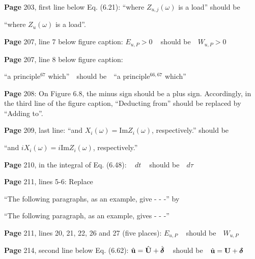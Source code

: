 \documentclass[a4paper,12pt]{article}
\newcommand{\bdelta}{\mbox{\boldmath ${\rm \delta}$}}
\begin{document}
\noindent %
{\bf Page} 203, first line below Eq. (6.21):    
``where $Z_{u,j}(\omega)$ is a load'' should be 

``where $Z_{u}(\omega)$ is a load''.   %
\vspace{0.2cm}

\noindent %
{\bf Page} 207, line 7 below figure caption:  $E_{u,P} > 0$ \,\,\ should be \,\, $W_{u,P} > 0$ 
\vspace{0.2cm}

\noindent%
{\bf Page} 207, line 8 below figure caption:  

``a principle$^{67}$ which'' \,\ should be \,\,  ``a principle$^{66,67}$ which'' %
\vspace{0.2cm} 

\noindent %
{\bf Page} 208: On Figure 6.8, the minus sign should be a plus sign. Accordingly, in the third line of the figure caption,    
``Deducting from'' should be replaced by ``Adding to''.   %
\vspace{0.2cm}

\noindent %
{\bf Page} 209, last line:    
``and $X_i(\omega)=\mbox{Im}{Z_i(\omega)}$, respectively.'' should be 

``and $iX_i(\omega)=i\mbox{Im}{Z_i(\omega)}$, respectively.''   %
\vspace{0.2cm}

\noindent %
{\bf Page} 210, in the integral of Eq. (6.48): \,\,\,  $dt$ \,\,\ should be \,\,
 $d\tau$ %

\vspace{0.2cm}

\noindent %
{\bf Page} 211, lines 5-6: Replace 

``The following paragraphs, as an example, give - - -'' by

``The following paragraph, as an example, gives - - -'' %
\vspace{0.2cm}

\noindent %
{\bf Page} 211, lines 20, 21, 22, 26 and 27 (five places):  $E_{u,P}$ \,\,\ should be \,\, $W_{u,P}$ %
\vspace{0.2cm}

\noindent %
{\bf Page} 214, second line below Eq. (6.62):  $\hat{\bf u}=\hat{\bf U}+\hat{\bdelta}$ \,\,\ should be \,\,
 $\hat{\bf u}=\bf U+\bdelta$ %
\vspace{0.2cm}
\end{document}
